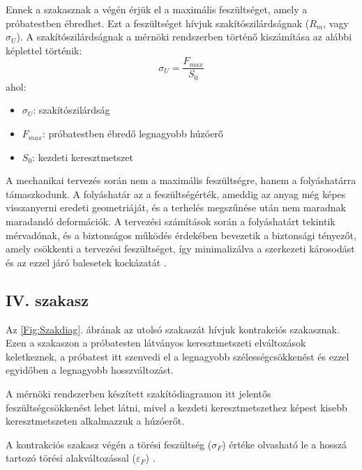 \documentclass[12pt,a4paper,oneside]{report}
\begin{document}
Ennek a szakasznak a végén érjük el a maximális feszültséget, amely a próbatestben ébredhet. Ezt a feszültséget hívjuk szakítószilárdságnak ($R_m$, vagy $\sigma_U$). A szakítószilárdságnak a mérnöki rendszerben történő kiszámítása az alábbi képlettel történik:
\begin{equation}
\sigma_U=\dfrac{F_{max}}{S_0}
\end{equation}
ahol:
\begin{itemize}
\item $\sigma_U$: szakítószilárdság
\item $F_{max}$: próbatestben ébredő legnagyobb húzóerő
\item $S_0$: kezdeti keresztmetszet
\end{itemize}


A mechanikai tervezés során nem a maximális feszültségre, hanem a folyáshatárra támaszkodunk. A folyáshatár az a feszültségérték, ameddig az anyag még képes visszanyerni eredeti geometriáját, és a terhelés megszűnése után nem maradnak maradandó deformációk. A tervezési számítások során a folyáshatárt tekintik mérvadónak, és a biztonságos működés érdekében bevezetik a biztonsági tényezőt, amely csökkenti a tervezési feszültséget, így minimalizálva a szerkezeti károsodást és az ezzel járó balesetek kockázatát \cite{pek2015anyag}.

\subsection{IV. szakasz}
Az \ref{Fig:Szakdiag}. ábrának az utolsó szakaszát hívjuk kontrakciós szakasznak. Ezen a szakaszon a próbatesten látványos keresztmetszeti elváltozások keletkeznek, a próbatest itt szenvedi el a legnagyobb szélességcsökkenést és ezzel egyidőben a legnagyobb hosszváltozást.

A mérnöki rendszerben készített szakítódiagramon itt jelentős feszültségcsökkenést lehet látni, mivel a kezdeti keresztmetszethez képest kisebb keresztmetszeten alkalmazzuk a húzóerőt.

A kontrakciós szakasz végén a törési feszültség ($\sigma_F$) értéke olvasható le a hosszá tartozó törési alakváltozással ($\varepsilon_F$) \cite{pek2015anyag}.
\end{document}
